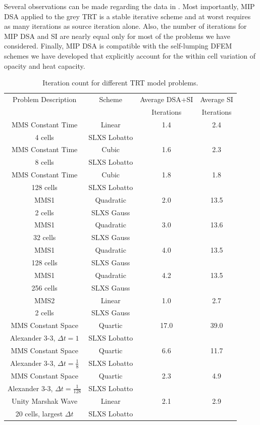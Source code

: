 Several observations can be made regarding the data in .  
Most importantly, MIP DSA applied to the grey TRT is a stable iterative scheme and at worst requires as many iterations as source iteration alone.
Also, the number of iterations for MIP DSA and SI are nearly equal only for most of the problems we have considered.
Finally, MIP DSA is compatible with the self-lumping DFEM schemes we have developed that explicitly account for the within cell variation of opacity and heat capacity.

\begin{table}[!htp]
\centering
\caption{Iteration count for different TRT model problems.}
\begin{tabular}{|c|c|c|c|}
\hline
Problem Description & Scheme & Average DSA+SI & Average SI \\
{}									&				 &  Iterations & Iterations  \\
\hline
MMS Constant Time & Linear  & 1.4 & 2.4 \\
4 cells 					& SLXS Lobatto & {} & {} \\
\hline
MMS Constant Time	 & Cubic 			 & 1.6 & 2.3 \\
8 cells 						& SLXS Lobatto & {} & {} \\
\hline
MMS Constant Time	 & Cubic 				 & 1.8 & 1.8 \\
128 cells 					& SLXS Lobatto & {} & {} \\
\hline
MMS1 						& Quadratic 		& 2.0 & 13.5 \\
2 cells 				& SLXS Gauss 		& {}  & {} \\
\hline
MMS1 						& Quadratic 	& 3.0 & 13.6 \\
32 cells 				& SLXS Gauss 	& {} & {} \\
\hline
MMS1	 				& Quadratic  & 4.0 & 13.5 \\
128 cells 		& SLXS Gauss & {} & {} \\
\hline
MMS1 					& Quadratic		& 4.2 & 13.5 \\
256 cells 		& SLXS Gauss 	& {} & {} \\
\hline
MMS2 						& Linear	 & 1.0 & 2.7 \\
2 cells 					& SLXS Gauss & {} & {} \\
\hline
MMS Constant Space 									& Quartic 				 & 17.0 & 39.0 \\
Alexander 3-3, $\Delta t=1$					& SLXS Lobatto 			& {}  & {} \\
\hline
MMS Constant Space 										& Quartic 				 & 6.6 & 11.7 \\
Alexander 3-3, $\Delta t=\frac{1}{8}$	& SLXS Lobatto 			& {}  & {} \\
\hline
MMS Constant Space 										& Quartic 				 & 2.3 & 4.9 \\
Alexander 3-3, $\Delta t=\frac{1}{128}$	& SLXS Lobatto 			& {}  & {} \\
\hline
Unity Marshak Wave 									&  Linear			 & 2.1 & 2.9 \\
20 cells, largest $\Delta t$	& SLXS Lobatto & {} 		 & {} \\
\hline
\end{tabular}
\label{tbl:iteration_count}
\end{table}

